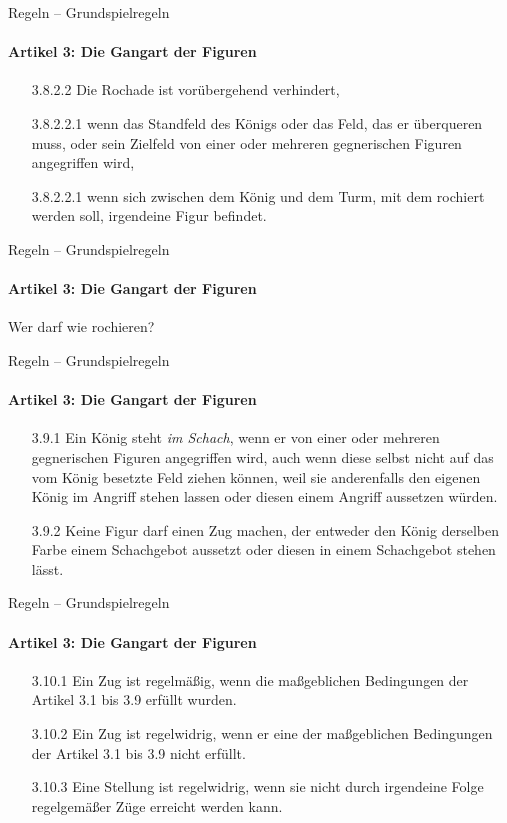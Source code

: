\documentclass[
  aspectratio=1610,
]{beamer}
\begin{document}
\begin{frame}{Regeln – Grundspielregeln}
  \framesubtitle{Artikel 3: Die Gangart der Figuren}
  \begin{itemize}
    \item[3.8.2.2] Die Rochade ist vorübergehend verhindert,
    \item[3.8.2.2.1] wenn das Standfeld des Königs oder das Feld, das er überqueren muss,
      oder sein Zielfeld von einer oder mehreren gegnerischen Figuren angegriffen wird,
    \item[3.8.2.2.1] wenn sich zwischen dem König und dem Turm, mit dem rochiert werden
      soll, irgendeine Figur befindet.
  \end{itemize}
\end{frame}

\begin{frame}[<+->]{Regeln – Grundspielregeln}
  \framesubtitle{Artikel 3: Die Gangart der Figuren}
  \begin{center}
    \chessboard[
      setfen=r3k2r/ppp3pp/3pN3/3n1P2/6q1/Q7/PPP3PP/R3K2R w KQkq - 0 1, %
      moveid=1w,
    ]

    Wer darf wie rochieren?
  \end{center}
\end{frame}

\begin{frame}[<+->]{Regeln – Grundspielregeln}
  \framesubtitle{Artikel 3: Die Gangart der Figuren}
  \begin{itemize}
    \item[3.9.1] Ein König steht \emph{im Schach}, wenn er von einer oder mehreren
      gegnerischen Figuren angegriffen wird, auch wenn diese selbst nicht auf das vom
      König besetzte Feld ziehen können, weil sie anderenfalls den eigenen König im
      Angriff stehen lassen oder diesen einem Angriff aussetzen würden.
    \item[3.9.2] Keine Figur darf einen Zug machen, der entweder den König derselben Farbe
      einem Schachgebot aussetzt oder diesen in einem Schachgebot stehen lässt.
  \end{itemize}
\end{frame}

\begin{frame}[<+->]{Regeln – Grundspielregeln}
  \framesubtitle{Artikel 3: Die Gangart der Figuren}
  \begin{itemize}
    \item[3.10.1] Ein Zug ist regelmäßig, wenn die maßgeblichen Bedingungen der Artikel
      3.1 bis 3.9 erfüllt wurden.
    \item[3.10.2] Ein Zug ist regelwidrig, wenn er eine der maßgeblichen Bedingungen der
      Artikel 3.1 bis 3.9 nicht erfüllt.
    \item[3.10.3] Eine Stellung ist regelwidrig, wenn sie nicht durch irgendeine Folge
      regelgemäßer Züge erreicht werden kann.
  \end{itemize}
\end{frame}
\end{document}
